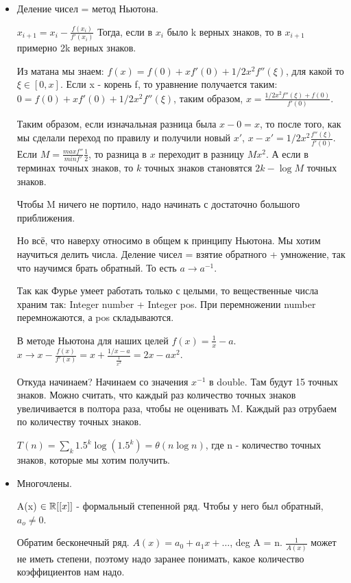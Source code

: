 \begin{enumerate}
\begin{itemize}
    \item Деление чисел = метод Ньютона.
    
    $x_{i + 1} = x_i - \frac{f(x_i)}{f'(x_i)}$ Тогда, если в $x_i$ было k верных знаков, то в $x_{i + 1}$ примерно 2k верных знаков.
    
    Из матана мы знаем: $f(x) = f(0) + xf'(0) + 1/2x^2f''(\xi)$, для какой то $\xi \in [0, x]$. Если x - корень f, то уравнение получается таким: $0 = f(0) + xf'(0) + 1/2x^2f''(\xi)$, таким образом, $x = \frac{1/2x^2f''(\xi) + f(0)}{f'(0)}$.
    
    Таким образом, если изначальная разница была $x - 0 = x$, то после того, как мы сделали переход по правилу и получили новый $x'$, $x - x' = 1/2x^2\frac{f''(\xi)}{f'(0)}$. Если $M = \frac{max f''}{min f'}\frac{1}{2}$, то разница в $x$ переходит в разницу $Mx^2$. А если в терминах точных знаков, то $k$ точных знаков становятся $2k - \log M$ точных знаков. 
    
    Чтобы M ничего не портило, надо начинать с достаточно большого приближения.
    
    Но всё, что наверху относимо в общем к принципу Ньютона. Мы хотим научиться делить числа. Деление чисел = взятие обратного + умножение, так что научимся брать обратный. То есть $a \rightarrow a^{-1}$.
    
    Так как Фурье умеет работать только с целыми, то вещественные числа храним так: Integer number + Integer pos. При перемножении number перемножаются, а pos складываются.
    
    В методе Ньютона для наших целей $f(x) = \frac{1}{x} - a$. $x \rightarrow x - \frac{f(x)}{f'(x)} = x + \frac{1/x - a}{\frac{1}{x^2}} = 2x - ax^2$.
    
    Откуда начинаем? Начинаем со значения $x^{-1}$ в double. Там будут 15 точных знаков. Можно считать, что каждый раз количество точных знаков увеличивается в полтора раза, чтобы не оценивать M. Каждый раз отрубаем по количеству точных знаков.
    
    $T(n) = \sum\limits_{k} 1.5^k\log(1.5^k) = \theta(n \log n)$, где n - количество точных знаков, которые мы хотим получить.
    
    \item Многочлены.
    
    A(x) $\in \mathbb{R}[[x]]$ - формальный степенной ряд. Чтобы у него был обратный, $a_o \ne 0$.
    
    Обратим бесконечный ряд. $A(x) = a_0 + a_1x + \dots$, deg A = n. $\frac{1}{A(x)}$ может не иметь степени, поэтому надо заранее понимать, какое количество коэффициентов нам надо.
    

\end{itemize}
\end{enumerate}
